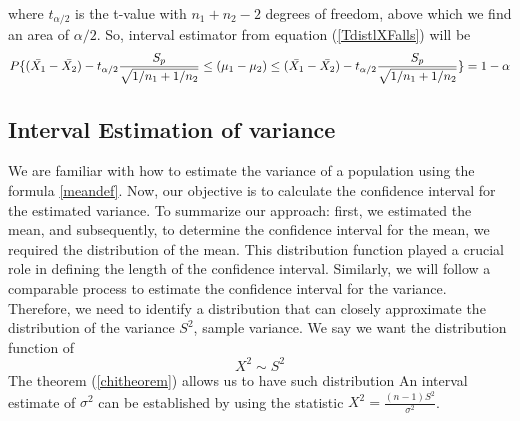 \documentclass[12pt,a4paper]{article}
\theoremstyle{example}
\theoremstyle{definition}
\theoremstyle{theorem}
\begin{document}
where \(t_{\alpha/2}\) is the t-value with \(n_1 + n_2 - 2\) degrees of freedom, above which we find an area of \(\alpha/2\). So, interval estimator from equation (\ref{TdistlXFalls}) will be 
\begin{equation}
    P\{(\Bar{X_1}-\Bar{X_2})-t_{\alpha/2}\frac{S_p}{\sqrt{1/n_1+1/n_2}}\leq(\mu_1-\mu_2)\leq(\Bar{X_1}-\Bar{X_2})-t_{\alpha/2}\frac{S_p}{\sqrt{1/n_1+1/n_2}}\}=1-\alpha
\end{equation}

\subsection{Interval Estimation of variance }
We are familiar with how to estimate the variance of a population using the formula \ref{meandef}. Now, our objective is to calculate the confidence interval for the estimated variance. To summarize our approach: first, we estimated the mean, and subsequently, to determine the confidence interval for the mean, we required the distribution of the mean. This distribution function played a crucial role in defining the length of the confidence interval. Similarly, we will follow a comparable process to estimate the confidence interval for the variance. Therefore, we need to identify a distribution that can closely approximate the distribution of the variance  $S^2$, sample variance. 
We say we want the distribution function of
$$X^2\sim S^2$$
The theorem (\ref{chitheorem}) allows us to have such distribution 
An interval estimate of $\sigma^2$ can be established by using the statistic $X^2 = \frac{(n - 1)S^2}{\sigma^2}$. \citep{walpole1993probability}
\begin{center}
\end{center}
\end{document}
